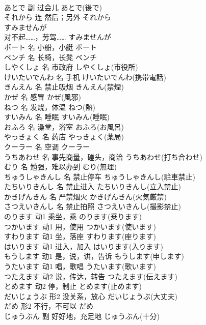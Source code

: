 \documentclass[8pt]{extreport}
\begin{document}
\begin{CJK}{UTF8}{min}
\\	あとで	副	过会儿	あとで(後で)	
\\	それから	连	然后；另外	それから	
\\	すみませんが	
\\	对不起……，劳驾……	すみませんが	
\\	ボート	名	小船，小艇	ボート	
\\	ベンチ	名	长椅，长凳	ベンチ	
\\	しやくしょ	名	市政府	しやくしょ(市役所)	
\\	けいたいでんわ	名	手机	けいたいでんわ(携帯電話)	
\\	きんえん	名	禁止吸烟	きんえん(禁煙)	
\\	かぜ	名	感冒	かぜ(風邪)	
\\	ねつ	名	发烧，体温	ねつ(熱)	
\\	すいみん	名	睡眠	すいみん(睡眠)	
\\	おふろ	名	澡堂，浴室	おふろ(お風呂)	
\\	やっきょく	名	药店	やっきょく(薬局)	
\\	クーラー	名	空调	クーラー	
\\	うちあわせ	名	事先商量，碰头，商洽	うちあわせ(打ち合わせ)	
\\	むり	名	勉强，难以办到	むり(無理)	
\\	ちゅうしゃきんし	名	禁止停车	ちゅうしゃきんし(駐車禁止)	
\\	たちいりきんし	名	禁止进入	たちいりきんし(立入禁止)	
\\	かきげんきん	名	严禁烟火	かきげんきん(火気厳禁)	
\\	さつえいきんし	名	禁止拍照	さつえいきんし(撮影禁止)	
\\	のります	动1	乘坐，乘	のります(乗ります)	
\\	つかいます	动1	用，使用	つかいます(使います)	
\\	すわります	动1	坐，落座	すわります(座ります)	
\\	はいります	动1	进入，加入	はいります(入ります)	
\\	もうします	动1	是，说，讲，告诉	もうします(申します)	
\\	うたいます	动1	唱，歌唱	うたいます(歌います)	
\\	つたえます	动2	说，传达，转告	つたえます(伝えます)	
\\	とめます	动2	停，制止	とめます(止めます)	
\\	だいじょうぶ	形2	没关系，放心	だいじょうぶ(大丈夫)	
\\	だめ	形2	不行，不可以	だめ	
\\	じゅうぶん	副	好好地，充足地	じゅうぶん(十分)	

\end{CJK}
\end{document}
